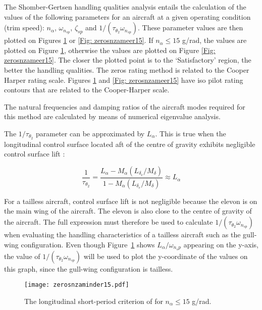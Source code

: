 \documentclass{report}
\begin{document}
The Shomber-Gertsen handling qualities analysis entails the calculation of the values of the following parameters for an aircraft at a given operating condition (trim speed):  $n_{\alpha}$, $\omega_{n_{sp}}$, $\zeta_{sp}$ and $1/(\tau_{\theta_2}\omega_{n_{sp}})$.  These parameter values are then plotted on Figures \ref{Fig: zerosnzaminder15} or \ref{Fig: zerosnzameer15}.  If $n_{\alpha} \le 15$ g/rad, the values are plotted on Figure \ref{Fig: zerosnzaminder15}, otherwise the values are plotted on Figure \ref{Fig: zerosnzameer15}.  The closer the plotted point is to the `Satisfactory' region, the better the handling qualities.  The zeros rating method is related to the Cooper Harper rating scale.  Figures \ref{Fig: zerosnzaminder15} and \ref{Fig: zerosnzameer15} have iso pilot rating contours that are related to the Cooper-Harper scale.

The natural frequencies and damping ratios of the aircraft modes required for this method are calculated by means of numerical eigenvalue analysis.

The $1/\tau_{\theta_2}$ parameter can be approximated by $L_\alpha$.  This is true when the longitudinal control surface located aft of the centre of gravity exhibits negligible control surface lift \citep{ZeroGertsen}:  

\begin{equation}
	\frac{1}{\tau_{\theta_2}} = \frac{L_\alpha - M_\alpha(L_{\delta_e}/M_\delta)}{1 - M_{\dot{\alpha}} (L_{\delta_e}/M_\delta)} \approx L_\alpha
\end{equation}

For a tailless aircraft, control surface lift is not negligible because the elevon is on the main wing of the aircraft.  The elevon is also close to the centre of gravity of the aircraft.  The full expression must therefore be used to calculate $1/(\tau_{\theta_2}\omega_{n_{sp}})$ when evaluating the handling characteristics of a tailless aircraft such as the gull-wing configuration.  Even though \mbox{Figure \ref{Fig: zerosnzaminder15}} shows $L_\alpha/\omega_{n_sp}$ appearing on the y-axis, the value of $1/(\tau_{\theta_2}\omega_{n_{sp}})$ will be used to plot the y-coordinate of the values on this graph, since the gull-wing configuration is tailless.

\begin{figure}[htb]
	\begin{center}
		\texttt{[image: zerosnzaminder15.pdf]}
	\end{center}
	\caption{The longitudinal short-period criterion of \cite{ZeroGertsen} for $n_{\alpha} \le 15$ g/rad.}
	\label{Fig: zerosnzaminder15}
\end{figure}
\end{document}

